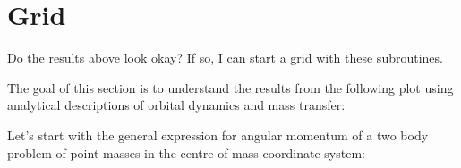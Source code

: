 \documentclass[a4paper,10pt]{article}
\begin{document}
\section{Grid}
Do the results above look okay? If so, I can start a grid with these subroutines.


The goal of this section is to understand the results from the following plot using analytical descriptions of orbital dynamics and mass transfer:
\begin{figure}[ht]
    \centering
\end{figure}

Let's start with the general expression for angular momentum of a two body problem of point masses in the centre of mass coordinate system:
\end{document}
